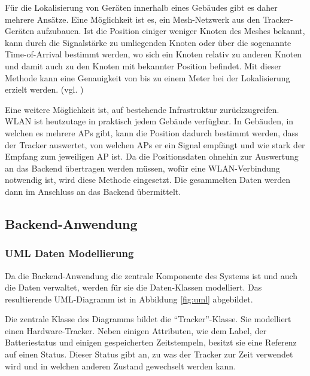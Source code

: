 Für die Lokalisierung von Geräten innerhalb eines Gebäudes gibt es daher mehrere Ansätze.
Eine Möglichkeit ist es, ein Mesh-Netzwerk aus den Tracker-Geräten aufzubauen. Ist die Position
einiger weniger Knoten des Meshes bekannt, kann durch die Signalstärke zu umliegenden Knoten oder
über die sogenannte Time-of-Arrival bestimmt werden, wo sich ein Knoten relativ zu anderen Knoten
und damit auch zu den Knoten mit bekannter Position befindet.
Mit dieser Methode kann eine Genauigkeit von bis zu einem Meter bei der Lokalisierung erzielt
werden. (vgl. \cite{Patwari2003})

Eine weitere Möglichkeit ist, auf bestehende Infrastruktur zurückzugreifen. \Gls{WLAN} ist
heutzutage in praktisch jedem Gebäude verfügbar.
In Gebäuden, in welchen es mehrere \glspl{AP} gibt, kann die Position dadurch bestimmt werden,
dass der Tracker auswertet, von welchen \glspl{AP} er ein Signal empfängt und wie stark der
Empfang zum jeweiligen \gls{AP} ist.
Da die Positionsdaten ohnehin zur Auswertung an das Backend übertragen werden müssen, wofür eine
\gls{WLAN}-Verbindung notwendig ist, wird diese Methode eingesetzt.
Die gesammelten Daten werden dann im Anschluss an das Backend übermittelt.


\subsection{Backend-Anwendung} \label{sec:backend}

\subsubsection{UML Daten Modellierung}
Da die Backend-Anwendung die zentrale Komponente des Systems ist und auch die Daten verwaltet, werden für sie die Daten-Klassen modelliert.
Das resultierende UML-Diagramm ist in Abbildung \ref{fig:uml} abgebildet.

Die zentrale Klasse des Diagramms bildet die \enquote{Tracker}-Klasse.
Sie modelliert einen Hardware-Tracker.
Neben einigen Attributen, wie dem Label, der Batteriestatus und einigen gespeicherten Zeitstempeln, besitzt sie eine Referenz auf einen Status.
Dieser Status gibt an, zu was der Tracker zur Zeit verwendet wird und in welchen anderen Zustand gewechselt werden kann.

